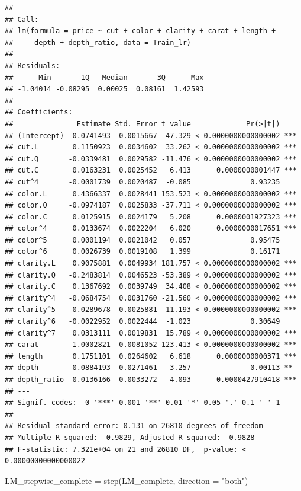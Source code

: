 \documentclass[
]{article}
\newenvironment{Shaded}{\begin{snugshade}}{\end{snugshade}}
\newcommand{\AttributeTok}[1]{\textcolor[rgb]{0.77,0.63,0.00}{#1}}
\newcommand{\FunctionTok}[1]{\textcolor[rgb]{0.00,0.00,0.00}{#1}}
\newcommand{\NormalTok}[1]{#1}
\newcommand{\OtherTok}[1]{\textcolor[rgb]{0.56,0.35,0.01}{#1}}
\newcommand{\StringTok}[1]{\textcolor[rgb]{0.31,0.60,0.02}{#1}}
\begin{document}
\begin{verbatim}
## 
## Call:
## lm(formula = price ~ cut + color + clarity + carat + length + 
##     depth + depth_ratio, data = Train_lr)
## 
## Residuals:
##      Min       1Q   Median       3Q      Max 
## -1.04014 -0.08295  0.00025  0.08161  1.42593 
## 
## Coefficients:
##               Estimate Std. Error t value             Pr(>|t|)    
## (Intercept) -0.0741493  0.0015667 -47.329 < 0.0000000000000002 ***
## cut.L        0.1150923  0.0034602  33.262 < 0.0000000000000002 ***
## cut.Q       -0.0339481  0.0029582 -11.476 < 0.0000000000000002 ***
## cut.C        0.0163231  0.0025452   6.413      0.0000000001447 ***
## cut^4       -0.0001739  0.0020487  -0.085              0.93235    
## color.L      0.4366337  0.0028441 153.523 < 0.0000000000000002 ***
## color.Q     -0.0974187  0.0025833 -37.711 < 0.0000000000000002 ***
## color.C      0.0125915  0.0024179   5.208      0.0000001927323 ***
## color^4      0.0133674  0.0022204   6.020      0.0000000017651 ***
## color^5      0.0001194  0.0021042   0.057              0.95475    
## color^6      0.0026739  0.0019108   1.399              0.16171    
## clarity.L    0.9075881  0.0049934 181.757 < 0.0000000000000002 ***
## clarity.Q   -0.2483814  0.0046523 -53.389 < 0.0000000000000002 ***
## clarity.C    0.1367692  0.0039749  34.408 < 0.0000000000000002 ***
## clarity^4   -0.0684754  0.0031760 -21.560 < 0.0000000000000002 ***
## clarity^5    0.0289678  0.0025881  11.193 < 0.0000000000000002 ***
## clarity^6   -0.0022952  0.0022444  -1.023              0.30649    
## clarity^7    0.0313111  0.0019831  15.789 < 0.0000000000000002 ***
## carat        1.0002821  0.0081052 123.413 < 0.0000000000000002 ***
## length       0.1751101  0.0264602   6.618      0.0000000000371 ***
## depth       -0.0884193  0.0271461  -3.257              0.00113 ** 
## depth_ratio  0.0136166  0.0033272   4.093      0.0000427910418 ***
## ---
## Signif. codes:  0 '***' 0.001 '**' 0.01 '*' 0.05 '.' 0.1 ' ' 1
## 
## Residual standard error: 0.131 on 26810 degrees of freedom
## Multiple R-squared:  0.9829, Adjusted R-squared:  0.9828 
## F-statistic: 7.321e+04 on 21 and 26810 DF,  p-value: < 0.00000000000000022
\end{verbatim}

\begin{Shaded}
\begin{Highlighting}[]
\NormalTok{LM\_stepwise\_complete }\OtherTok{=} \FunctionTok{step}\NormalTok{(LM\_complete, }\AttributeTok{direction =} \StringTok{"both"}\NormalTok{)}
\end{Highlighting}
\end{Shaded}
\end{document}
